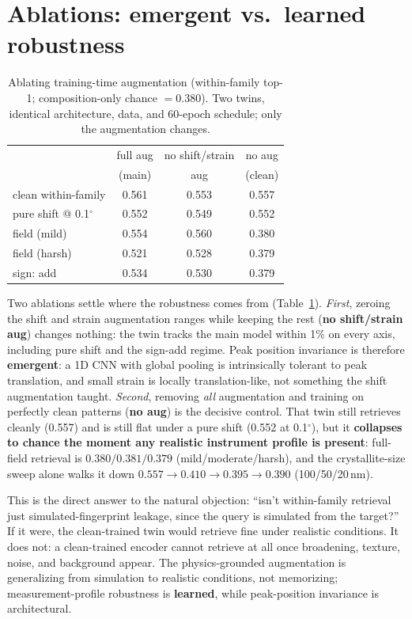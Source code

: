 \documentclass[conference]{IEEEtran}
\begin{document}
\section{Ablations: emergent vs.\ learned robustness}\label{sec:ablation}
\begin{table}[t]
  \centering
  \caption{Ablating training-time augmentation (within-family top-1;
  composition-only chance $=0.380$). Two twins, identical architecture, data, and
  60-epoch schedule; only the augmentation changes.}
  \label{tab:ablation}
  \small
  \begin{tabular}{lccc}
    \toprule
     & full aug & no shift/strain & no aug \\
     & (main) & aug & (clean) \\
    \midrule
    clean within-family        & 0.561 & 0.553 & 0.557 \\
    pure shift @ 0.1$^\circ$   & 0.552 & 0.549 & 0.552 \\
    field (mild)               & 0.554 & 0.560 & 0.380 \\
    field (harsh)              & 0.521 & 0.528 & 0.379 \\
    sign: add                  & 0.534 & 0.530 & 0.379 \\
    \bottomrule
  \end{tabular}
\end{table}

Two ablations settle where the robustness comes from (Table~\ref{tab:ablation}).
\emph{First}, zeroing the shift and strain augmentation ranges while keeping the
rest (\textbf{no shift/strain aug}) changes nothing: the twin tracks the main
model within 1\% on every axis, including pure shift and the sign-add regime. Peak
position invariance is therefore \textbf{emergent}: a 1D CNN with global pooling
is intrinsically tolerant to peak translation, and small strain is locally
translation-like, not something the shift augmentation taught. \emph{Second},
removing \emph{all} augmentation and training on perfectly clean patterns
(\textbf{no aug}) is the decisive control. That twin still retrieves cleanly
(0.557) and is still flat under a pure shift (0.552 at 0.1$^\circ$), but it
\textbf{collapses to chance the moment any realistic instrument profile is
present}: full-field retrieval is $0.380/0.381/0.379$ (mild/moderate/harsh), and
the crystallite-size sweep alone walks it down $0.557\to0.410\to0.395\to0.390$
(100/50/20\,nm).

This is the direct answer to the natural objection: ``isn't within-family
retrieval just simulated-fingerprint leakage, since the query is simulated from
the target?'' If it were, the clean-trained twin would retrieve fine under
realistic conditions. It does not: a clean-trained encoder cannot retrieve at all
once broadening, texture, noise, and background appear. The physics-grounded
augmentation is generalizing from simulation to realistic conditions, not
memorizing; measurement-profile robustness is \textbf{learned}, while peak-position invariance
is architectural.
\end{document}
